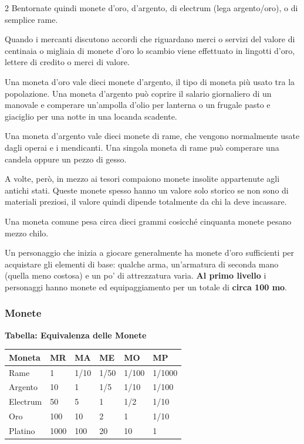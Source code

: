 \begin{multicols}{2}
Bentornate quindi monete d'oro, d'argento, di electrum (lega argento/oro), o di semplice rame.

Quando i mercanti discutono accordi che riguardano merci o servizi del valore di centinaia o migliaia di monete d'oro lo scambio viene effettuato in lingotti d'oro, lettere di credito o merci di valore.

Una moneta d'oro vale dieci monete d'argento, il tipo di moneta più usato tra la popolazione. Una moneta d'argento può coprire il salario giornaliero di un manovale e comperare un'ampolla d'olio per lanterna o un frugale pasto e giaciglio per una notte in una locanda scadente.

Una moneta d'argento vale dieci monete di rame, che vengono normalmente usate dagli operai e i mendicanti. Una singola moneta di rame può comperare una candela oppure un pezzo di gesso.

A volte, però, in mezzo ai tesori compaiono monete insolite appartenute agli antichi stati. Queste monete spesso hanno un valore solo storico se non sono di materiali preziosi, il valore quindi dipende totalmente da chi la deve incassare.

Una moneta comune pesa circa dieci grammi cosicché cinquanta monete pesano mezzo chilo.

Un personaggio che inizia a giocare generalmente ha monete d'oro sufficienti per acquistare gli elementi di base: qualche arma, un'armatura di seconda mano (quella meno costosa) e un po' di attrezzatura varia. \textbf{Al primo livello} i personaggi hanno monete ed equipaggiamento per un totale di \textbf{circa 100 mo}.

\subsubsection{Monete}

\textbf{Tabella: Equivalenza delle Monete}

\medskip

{\small
\noindent\begin{tabularx}{1\linewidth}{Xlllll}
\toprule
\rowcolor{gray!20}\textbf{Moneta} & \textbf{MR}&\textbf{MA}&\textbf{ME}&\textbf{MO}&\textbf{MP}\\
\toprule
Rame& 1& 1/10& 1/50& 1/100& 1/1000\\
\rowcolor{gray!20}Argento & 10 & 1 & 1/5& 1/10 & 1/100\\
Electrum & 50 & 5 & 1 & 1/2& 1/10\\
\rowcolor{gray!20}Oro & 100 & 10 & 2& 1 & 1/10\\
Platino & 1000 & 100 & 20& 10 & 1
\end{tabularx}}


\end{multicols}

